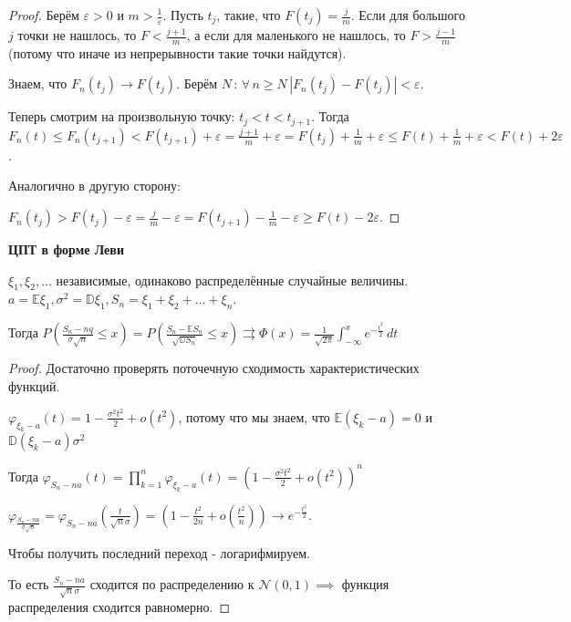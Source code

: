\begin{proof}
    Берём $\varepsilon > 0$ и $m > \frac{1}{\varepsilon}$. Пусть $t_j$, такие, что $F(t_j) = \frac{j}{m}$. Если для большого $j$ точки не нашлось, то
    $F < \frac{j + 1}{m}$, а если для маленького не нашлось, то $F > \frac{j - 1}{m}$ (потому что иначе из непрерывности такие точки найдутся).

    Знаем, что $F_n(t_j) \rightarrow F(t_j)$. Берём $N \, : \, \forall \, n \geqslant N \, |F_n(t_j) - F(t_j)| < \varepsilon$.

    Теперь смотрим на произвольную точку: $t_j < t < t_{j + 1}$. Тогда 
    $F_n(t) \leqslant F_n(t_{j + 1}) < F(t_{j + 1}) + \varepsilon = \frac{j + 1}{m} + \varepsilon = F(t_j) + \frac{1}{m} + \varepsilon \leqslant F(t) + \frac{1}{m} + \varepsilon < F(t) + 2\varepsilon$.

    Аналогично в другую сторону:

    $F_n (t_j) > F(t_j) - \varepsilon = \frac{j}{m} - \varepsilon = F(t_{j + 1}) - \frac{1}{m} - \varepsilon \geqslant F(t) - 2\varepsilon$.

\end{proof}


\begin{theorem}
    \textbf{ЦПТ в форме Леви}

    $\xi_1, \xi_2, \ldots $ независимые, одинаково распределённые случайные величины. $a = \mathbb{E} \xi_1, 
    \sigma^2 = \mathbb{D} \xi_1, S_n = \xi_1 + \xi_2 + \ldots + \xi_n$.

    Тогда $P \left ( \frac{S_n - nq}{\sigma \sqrt{n}} \leqslant x \right ) = P\left ( \frac{S_n - \mathbb{E} S_n}{\sqrt{\mathbb{D} S_n}} \leqslant x \right ) \rightrightarrows \Phi (x) = \frac{1}{\sqrt{2\pi}} \int_{-\infty}^x e^{-\frac{t^2}{2}} \, dt$
\end{theorem}

\begin{proof}
    Достаточно проверять поточечную сходимость характеристических функций.

    $\varphi_{\xi_k - a} (t) = 1 - \frac{\sigma^2 t^2}{2} + o(t^2)$, потому что 
    мы знаем, что $\mathbb{E} (\xi_k - a) = 0$ и $\mathbb{D} (\xi_k - a) \sigma^2$

    Тогда $\varphi_{S_n - na} (t) = \prod\limits_{k = 1}^n \varphi_{\xi_k - a} (t) = \left ( 1 - \frac{\sigma^2t^2}{2} + o(t^2) \right )^n$

    $\varphi_{\frac{S_n - na}{\sigma \sqrt{n}}} = \varphi_{S_n - na} \left ( \frac{t}{\sqrt{n}\sigma} \right ) = \left( 1 - \frac{t^2}{2n} + o(\frac{t^2}{n}) \right) \rightarrow e^{-\frac{t^2}{2}}$.

    Чтобы получить последний переход - логарифмируем.

    То есть $\frac{S_n - na}{\sqrt{n} \sigma}$ сходится по распределению к $\mathcal{N} (0, 1) \implies$ функция распределения сходится равномерно.
\end{proof}

